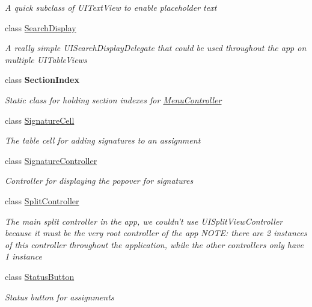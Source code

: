\begin{DoxyCompactItemize}
\begin{DoxyCompactList}\small\item\em A quick subclass of U\+I\+Text\+View to enable placeholder text \end{DoxyCompactList}\item 
class \hyperlink{class_field_service_1_1i_o_s_1_1_search_display}{Search\+Display}
\begin{DoxyCompactList}\small\item\em A really simple U\+I\+Search\+Display\+Delegate that could be used throughout the app on multiple U\+I\+Table\+Views \end{DoxyCompactList}\item 
class {\bfseries Section\+Index}
\begin{DoxyCompactList}\small\item\em Static class for holding section indexes for \hyperlink{class_field_service_1_1i_o_s_1_1_menu_controller}{Menu\+Controller} \end{DoxyCompactList}\item 
class \hyperlink{class_field_service_1_1i_o_s_1_1_signature_cell}{Signature\+Cell}
\begin{DoxyCompactList}\small\item\em The table cell for adding signatures to an assignment \end{DoxyCompactList}\item 
class \hyperlink{class_field_service_1_1i_o_s_1_1_signature_controller}{Signature\+Controller}
\begin{DoxyCompactList}\small\item\em Controller for displaying the popover for signatures \end{DoxyCompactList}\item 
class \hyperlink{class_field_service_1_1i_o_s_1_1_split_controller}{Split\+Controller}
\begin{DoxyCompactList}\small\item\em The main split controller in the app, we couldn't use U\+I\+Split\+View\+Controller because it must be the very root controller of the app N\+O\+T\+E\+: there are 2 instances of this controller throughout the application, while the other controllers only have 1 instance \end{DoxyCompactList}\item 
class \hyperlink{class_field_service_1_1i_o_s_1_1_status_button}{Status\+Button}
\begin{DoxyCompactList}\small\item\em Status button for assignments \end{DoxyCompactList}\item 

\end{DoxyCompactItemize}
